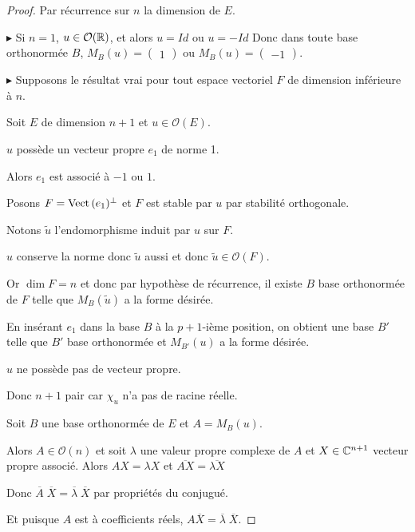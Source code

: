 \begin{proof}
    Par récurrence sur $n$ la dimension de $E$. 

    $\blacktriangleright$ Si $n = 1$, $u \in \mathcal O(\mathbb{R})$, et alors $u = Id$ ou $u = - Id$
    Donc dans toute base orthonormée $B$, $M_B(u) = \begin{pmatrix}
        1
    \end{pmatrix}$ ou $M_B(u) = \begin{pmatrix}
        -1
    \end{pmatrix}$.

    \avspace $\blacktriangleright$ Supposons le résultat vrai pour tout espace vectoriel $F$ de 
    dimension inférieure à $n$. 

    Soit $E$ de dimension $n + 1$ et $u \in \mathcal O(E)$.

     $u$ possède un vecteur propre $e_1$ de norme 1. 

    \svspace Alors $e_1$ est associé à $-1$ ou $1$. 

    Posons $F = \operatorname{Vect} \,(e_1)^\perp$ et $F$ est stable par $u$ par stabilité orthogonale.

    Notons $\tilde u$ l'endomorphisme induit par $u$ sur $F$. 

    $u$ conserve la norme donc $\tilde u$ aussi et donc $\tilde u \in \mathcal O(F)$.

    Or $\dim F = n$ et donc par hypothèse de récurrence, 
    il existe $B$ base orthonormée de $F$ telle que $M_B(\tilde u)$ a la forme désirée. 

    En insérant $e_1$ dans la base $B$ à la $p + 1$-ième position, on obtient une base 
    $B'$ telle que $B'$ base orthonormée et $M_{B'}(u)$ a la forme désirée.

     $u$ ne possède pas de vecteur propre.

    Donc $n + 1$ pair car $\chi_u$ n'a pas de racine réelle. 

    Soit $B$ une base orthonormée de $E$ et $A = M_B(u)$. 

    Alors $A \in \mathcal O(n)$ et soit $\lambda$ une valeur propre complexe de $A$ et $X \in \mathbb{C}^{n + 1}$ vecteur 
    propre associé. Alors $AX = \lambda X$ et $\overline{AX} = \overline{\lambda X}$
    
    Donc $\overline A \; \overline X = \overline \lambda \; \overline X$ par propriétés du conjugué. 
    
    Et puisque $A$ est à coefficients réels, $A \overline X = \overline \lambda \; \overline X$. 


\end{proof}
